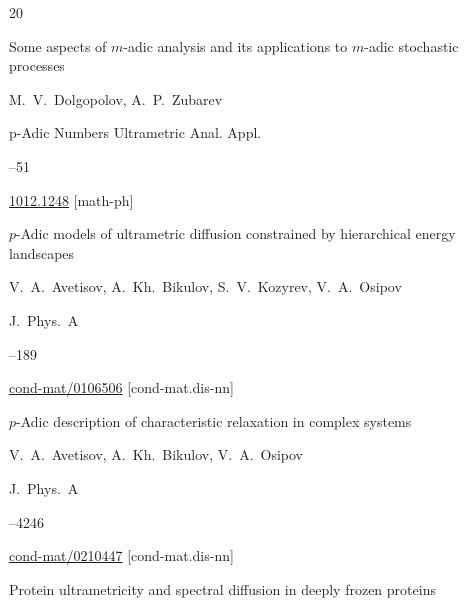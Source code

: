 {\begin{thebibliography}{20}

\paper Some aspects of $m$-adic analysis and its applications to $m$-adic stochastic processes

\by M.~V.~Dolgopolov, A.~P.~Zubarev

\jour p-Adic Numbers Ultrametric Anal. Appl. 




–51

\arxiv \href{http://arxiv.org/abs/1012.1248}{1012.1248} [math-ph]








\paper $p$-Adic models of ultrametric diffusion constrained by hierarchical energy landscapes

\by V.~A.~Avetisov, A.~Kh.~Bikulov, S.~V.~Kozyrev, V.~A.~Osipov

\jour J.~Phys.~A




--189

\arxiv \href{http://arxiv.org/abs/cond-mat/0106506}{cond-mat/0106506} [cond-mat.dis-nn]








\paper $p$-Adic description of characteristic relaxation in complex systems

\by V.~A.~Avetisov, A.~Kh.~Bikulov,  V.~A.~Osipov

\jour J.~Phys.~A




--4246

\arxiv \href{http://arxiv.org/abs/cond-mat/0210447}{cond-mat/0210447} [cond-mat.dis-nn]








\paper Protein ultrametricity and spectral diffusion in deeply frozen proteins


\end{thebibliography}}
